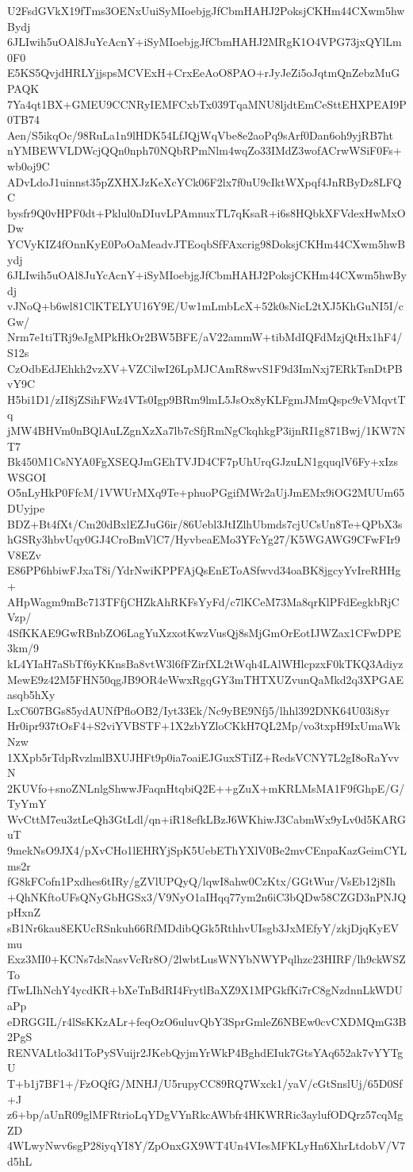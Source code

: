 U2FsdGVkX19fTms3OENxUuiSyMIoebjgJfCbmHAHJ2PoksjCKHm44CXwm5hwBydj
6JLIwih5uOAl8JuYcAcnY+iSyMIoebjgJfCbmHAHJ2MRgK1O4VPG73jxQYlLm0F0
E5KS5QvjdHRLYjjspsMCVExH+CrxEeAoO8PAO+rJyJeZi5oJqtmQnZebzMuGPAQK
7Ya4qt1BX+GMEU9CCNRyIEMFCxbTx039TqaMNU8ljdtEmCeSttEHXPEAI9P0TB74
Aen/S5ikqOc/98RuLa1n9lHDK54LfJQjWqVbe8e2aoPq9sArf0Dan6oh9yjRB7ht
nYMBEWVLDWcjQQn0nph70NQbRPmNlm4wqZo33IMdZ3wofACrwWSiF0Fs+wb0oj9C
ADvLdoJ1uinnst35pZXHXJzKeXcYCk06F2lx7f0uU9cIktWXpqf4JnRByDz8LFQC
bysfr9Q0vHPF0dt+Pklul0nDIuvLPAmnuxTL7qKsaR+i6s8HQbkXFVdexHwMxODw
YCVyKIZ4fOnnKyE0PoOaMeadvJTEoqbSfFAxcrig98DoksjCKHm44CXwm5hwBydj
6JLIwih5uOAl8JuYcAcnY+iSyMIoebjgJfCbmHAHJ2PoksjCKHm44CXwm5hwBydj
vJNoQ+b6wl81ClKTELYU16Y9E/Uw1mLmbLcX+52k0sNicL2tXJ5KhGuNI5I/cGw/
Nrm7e1tiTRj9eJgMPkHkOr2BW5BFE/aV22ammW+tibMdIQFdMzjQtHx1hF4/S12s
CzOdbEdJEhkh2vzXV+VZCilwI26LpMJCAmR8wvS1F9d3ImNxj7ERkTsnDtPBvY9C
H5bi1D1/zII8jZSihFWz4VTs0Igp9BRm9lmL5JsOx8yKLFgmJMmQspc9cVMqvtTq
jMW4BHVm0nBQlAuLZgnXzXa7lb7cSfjRmNgCkqhkgP3ijnRI1g871Bwj/1KW7NT7
Bk450M1CsNYA0FgXSEQJmGEhTVJD4CF7pUhUrqGJzuLN1gquqlV6Fy+xIzsWSGOI
O5nLyHkP0FfcM/1VWUrMXq9Te+phuoPGgifMWr2aUjJmEMx9iOG2MUUm65DUyjpe
BDZ+Bt4fXt/Cm20dBxlEZJuG6ir/86Uebl3JtIZlhUbmds7cjUCsUn8Te+QPbX3s
hGSRy3hbvUqy0GJ4CroBmVlC7/HyvbeaEMo3YFcYg27/K5WGAWG9CFwFIr9V8EZv
E86PP6hbiwFJxaT8i/YdrNwiKPPFAjQsEnEToASfwvd34oaBK8jgcyYvIreRHHg+
AHpWagm9mBc713TFfjCHZkAhRKFsYyFd/c7lKCeM73Ma8qrKlPFdEegkbRjCVzp/
4SfKKAE9GwRBnbZO6LagYuXzxotKwzVusQj8sMjGmOrEotIJWZax1CFwDPE3km/9
kL4YIaH7aSbTf6yKKnsBa8vtW3l6fFZirfXL2tWqh4LAlWHlcpzxF0kTKQ3Adiyz
MewE9z42M5FHN50qgJB9OR4eWwxRgqGY3mTHTXUZvunQaMkd2q3XPGAEasqb5hXy
LxC607BGs85ydAUNfPfloOB2/Iyt33Ek/Nc9yBE9Nfj5/lhhl392DNK64U03i8yr
Hr0ipr937tOsF4+S2viYVBSTF+1X2zbYZloCKkH7QL2Mp/vo3txpH9IxUmaWkNzw
1XXpb5rTdpRvzlmlBXUJHFt9p0ia7oaiEJGuxSTiIZ+RedsVCNY7L2gI8oRaYvvN
2KUVfo+snoZNLnlgShwwJFaqnHtqbiQ2E++gZuX+mKRLMsMA1F9fGhpE/G/TyYmY
WvCttM7eu3ztLeQh3GtLdl/qn+iR18efkLBzJ6WKhiwJ3CabmWx9yLv0d5KARGuT
9mekNsO9JX4/pXvCHo1lEHRYjSpK5UebEThYXlV0Be2mvCEnpaKazGeimCYLms2r
fG8kFCofn1Pxdhes6tIRy/gZVlUPQyQ/lqwI8ahw0CzKtx/GGtWur/VsEb12j8Ih
+QhNKftoUFsQNyGbHGSx3/V9NyO1aIHqq77ym2n6iC3bQDw58CZGD3nPNJQpHxnZ
sB1Nr6kau8EKUcRSnkuh66RfMDdibQGk5RthhvUIsgb3JxMEfyY/zkjDjqKyEVmu
Exz3MI0+KCNs7dsNasvVcRr8O/2lwbtLusWNYbNWYPqlhzc23HIRF/lh9ckWSZTo
fTwLIhNchY4ycdKR+bXeTnBdRI4FrytlBaXZ9X1MPGkfKi7rC8gNzdnnLkWDUaPp
eDRGGIL/r4lSsKKzALr+feqOzO6uluvQbY3SprGmleZ6NBEw0cvCXDMQmG3B2PgS
RENVALtlo3d1ToPySVuijr2JKebQyjmYrWkP4BghdEIuk7GtsYAq652ak7vYYTgU
T+b1j7BF1+/FzOQfG/MNHJ/U5rupyCC89RQ7Wxck1/yaV/cGtSnslUj/65D0Sf+J
z6+bp/aUnR09glMFRtrioLqYDgVYnRkcAWbfr4HKWRRic3aylufODQrz57cqMgZD
4WLwyNwv6sgP28iyqYI8Y/ZpOnxGX9WT4Un4VIesMFKLyHn6XhrLtdobV/V7d5hL
